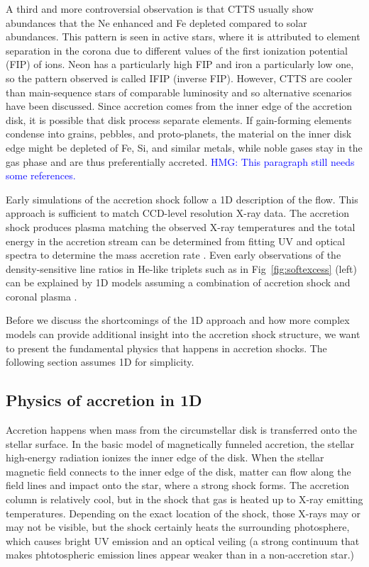 A third and more controversial observation is that CTTS usually show abundances that the Ne enhanced and Fe depleted compared to solar abundances. This pattern is seen in active stars, where it is attributed to element separation in the corona due to different values of the first ionization potential (FIP) of ions. Neon has a particularly high FIP and iron a particularly low one, so the pattern observed is called IFIP (inverse FIP). However, CTTS are cooler than main-sequence stars of comparable luminosity and so alternative scenarios have been discussed. Since accretion comes from the inner edge of the accretion disk, it is possible that disk process separate elements. If gain-forming elements condense into grains, pebbles, and proto-planets, the material on the inner disk edge might be depleted of Fe, Si, and similar metals, while noble gases stay in the gas phase and are thus preferentially accreted. \textcolor{blue}{HMG: This paragraph still needs some references.}

Early simulations of the accretion shock follow a 1D description of the flow. This approach is sufficient to match CCD-level resolution X-ray data. The accretion shock produces plasma matching the observed X-ray temperatures \citep{lamzin_1998} and the total energy in the accretion stream can be determined from fitting UV and optical spectra to determine the mass accretion rate \citep{calvet_1998}. Even early observations of the density-sensitive line ratios in He-like triplets such as in Fig~\ref{fig:softexcess} (left) can be explained by 1D models assuming a combination of accretion shock and coronal plasma \cite{Guenther_2007}.

Before we discuss the shortcomings of the 1D approach and how more complex models can provide additional insight into the accretion shock structure, we want to present the fundamental physics that happens in accretion shocks. The following section assumes 1D for simplicity.


\subsection{Physics of accretion in 1D}
\label{sect:accretionphysics}

Accretion happens when mass from the circumstellar disk is transferred onto the stellar surface. In the basic model of magnetically funneled accretion, the stellar high-energy radiation ionizes the inner edge of the disk. When the stellar magnetic field connects to the inner edge of the disk, matter can flow along the field lines and impact onto the star, where a strong shock forms. The accretion column is relatively cool, but in the shock that gas is heated up to X-ray emitting temperatures. Depending on the exact location of the shock, those X-rays may or may not be visible, but the shock certainly heats the surrounding photosphere, which causes bright UV emission and an optical veiling (a strong continuum that makes phtotospheric emission lines appear weaker than in a non-accretion star.)

